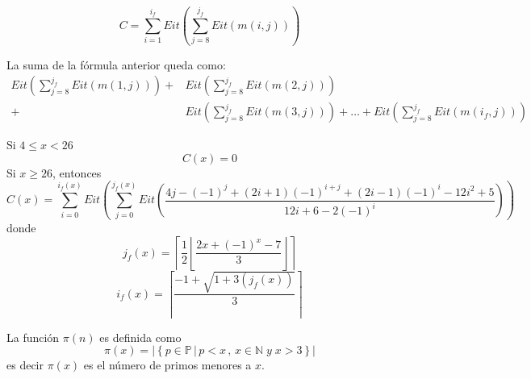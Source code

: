 \documentclass[10pt,letterpaper]{article}
\begin{document}
\begin{definicionf2}[Función C]
	\begin{equation}
		C=\sum_{i=1}^{i_f} Eit\left(\sum_{j=8}^{j_f}Eit(m(i,j))\right)
	\end{equation}
\end{definicionf2}
	
	La suma de la fórmula anterior queda como:
	\begin{align*} 
		Eit\left(\sum_{j=8}^{j_f}Eit(m(1,j))\right)+&Eit\left(\sum_{j=8}^{j_f}Eit(m(2,j))\right)\\
		+&Eit\left(\sum_{j=8}^{j_f}Eit(m(3,j))\right)+\dots+Eit\left(\sum_{j=8}^{j_f}Eit(m(i_f,j))\right) 
	\end{align*}

	\begin{teoremaf2} 
	Si $4 \leq x < 26$
	\begin{equation*}
		C(x) = 0
	\end{equation*}
	Si $x \geq 26 $, entonces
	\begin{equation*}
		C(x)	= \sum_{i = 0}^{i_f(x)} Eit\left( \sum_{j = 0}^{j_f(x)} Eit \left(\frac{4j - (-1)^j +  (2i + 1)(-1)^{i + j} + (2i - 1)(-1)^{i} - 12i^2 + 5}{12i + 6 -2 (-1)^i}\right) \right)		 
	\end{equation*}
	donde
	\begin{equation*}
		j_f(x) = \left\lceil \frac{1}{2}\left\lfloor \frac{2x + (-1)^x - 7}{3}\right\rfloor\right\rceil
	\end{equation*}	
	\begin{equation*}
		i_f(x) = \left\lceil  \frac{-1  + \sqrt{1 + 3(j_f(x))}	}{3}\right\rceil
	\end{equation*}	
\end{teoremaf2}

\begin{definicionf2}[Función $\pi(n)$ ]
La función $\pi(n)$ es definida como 
\begin{equation}
	\pi(x)   = |\left\lbrace p \in \mathbb{P} \, | \, p < x \,,\, x\in \mathbb{N} \; y \; x > 3 \right\rbrace  |
\end{equation}
es decir $\pi(x)$ es el número de primos menores  a $x$.
\end{definicionf2}
 
\end{document}
